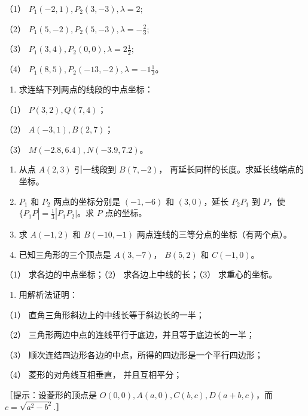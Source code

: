 （1） \(P_{1}(-2,1), P_{2}(3,-3), \lambda = 2;\)

（2） \(P_{1}(5, -2), P_{2}(5, -3), \lambda = -\frac{2}{3};\)

（3） \(P_{1}(3,4), P_{2}(0,0), \lambda = 2\frac{1}{2};\)

（4） \(P_{1}(8,5), P_{2}(-13, -2), \lambda = -1\frac{1}{3}\)。

\begin{enumerate}
\def\labelenumi{\arabic{enumi}.}
\setcounter{enumi}{2}
\tightlist
\item
  求连结下列两点的线段的中点坐标：
\end{enumerate}

（1） \(P(3, 2), Q(7, 4)\)；

（2） \(A(-3, 1), B(2, 7)\)；

（3） \(M(-2.8, 6.4), N(-3.9, 7.2)\)。

\begin{enumerate}
\def\labelenumi{\arabic{enumi}.}
\setcounter{enumi}{3}
\item
  从点 \(A(2,3)\) 引一线段到 \(B(7,-2)\)，
  再延长同样的长度。求延长线端点的坐标。
\item
  \(P_{1}\) 和 \(P_{2}\) 两点的坐标分别是 \((-1, -6)\) 和
  \((3, 0)\)，延长 \(P_{2}P_{1}\) 到 \(P\)，使
  \(\{P_{1}P| = \frac{1}{3} |P_{1}P_{2}|\)。求 \(P\) 点的坐标。
\item
  求 \(A(-1, 2)\) 和 \(B(-10, -1)\)
  两点连线的三等分点的坐标（有两个点）。
\item
  已知三角形的三个顶点是 \(A(3, -7)\)， \(B(5, 2)\) 和 \(C(-1, 0)\)。
\end{enumerate}

（1） 求各边的中点坐标；（2） 求各边上中线的长；（3） 求重心的坐标。

\begin{enumerate}
\def\labelenumi{\arabic{enumi}.}
\setcounter{enumi}{7}
\tightlist
\item
  用解析法证明：
\end{enumerate}

（1） 直角三角形斜边上的中线长等于斜边长的一半；

（2） 三角形两边中点的连线平行于底边，并且等于底边长的一半；

（3） 顺次连结四边形各边的中点，所得的四边形是一个平行四边形；

（4） 菱形的对角线互相垂直， 并且互相平分；

［提示：设菱形的顶点是 \(O(0,0), A(a,0), C(b,c), D(a+b, c)\)，而
\(c = \sqrt{a^2 - b^2}\).］

